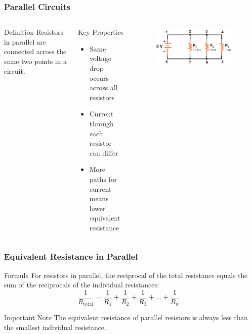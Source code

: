 \documentclass{beamer}
\begin{document}
\begin{frame}
    \frametitle{Parallel Circuits}
    \begin{columns}
        \begin{block}{Definition}
            Resistors in parallel are connected across the same two points in a circuit.
        \end{block}
        
        \begin{block}{Key Properties}
            \begin{itemize}
                \item Same voltage drop occurs across all resistors
                \item Current through each resistor can differ
                \item More paths for current means lower equivalent resistance
            \end{itemize}
        \end{block}
        
        \begin{alertblock}{ }
           \begin{figure}
               \centering
               \includegraphics[width=1\linewidth]{phys11-circuits-parallel-resistors.png}
           \end{figure}
        \end{alertblock}
    \end{columns}
\end{frame}

\begin{frame}
    \frametitle{Equivalent Resistance in Parallel}
    \begin{block}{Formula}
        For resistors in parallel, the reciprocal of the total resistance equals the sum of the reciprocals of the individual resistances:
        \begin{equation}
            \frac{1}{R_{\text{total}}} = \frac{1}{R_1} + \frac{1}{R_2} + \frac{1}{R_3} + \ldots + \frac{1}{R_n}
        \end{equation}
    \end{block}
    
   
    \begin{block}{Important Note}
        The equivalent resistance of parallel resistors is always less than the smallest individual resistance.
    \end{block}
\end{frame}
\end{document}
